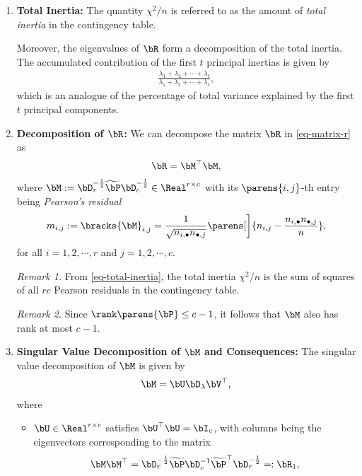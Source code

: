 \documentclass[12pt]{article}
\begin{document}
\begin{enumerate}[label=\textbf{\arabic*.}]
	\item \textbf{Total Inertia:} The quantity $\chi^2/n$ is referred to as the amount of \emph{total inertia} in the contingency table. 
	
	Moreover, the eigenvalues of $\bR$ form a decomposition of the total inertia. The accumulated contribution of the first $t$ principal inertias is given by 
	\begin{align*}
		\frac{\lambda_1 + \lambda_2 + \cdots + \lambda_t}{\lambda_1 + \lambda_2 + \cdots + \lambda_c}, 
	\end{align*}
	which is an analogue of the percentage of total variance explained by the first $t$ principal components. 
	
	\item \textbf{Decomposition of $\bR$:} We can decompose the matrix $\bR$ in \eqref{eq-matrix-r} as 
	\begin{align*}
		\bR = \bM^\top \bM, 
	\end{align*}
	where $\bM := \bD_r^{-\frac{1}{2}} \widetilde{\bP} \bD_c^{-\frac{1}{2}} \in \Real^{r \times c}$ with its $\parens{i, j}$-th entry being \emph{Pearson's residual}
	\begin{align*}
		m_{i,j} := \bracks{\bM}_{i,j} = \frac{1}{\sqrt{n_{i,\bullet} n_{\bullet,j}}} \parens[\bigg]{n_{i,j} - \frac{n_{i,\bullet} n_{\bullet,j}}{n}}, 
	\end{align*}
	for all $i = 1, 2, \cdots, r$ and $j = 1, 2, \cdots, c$. 
	
	\textit{Remark 1.} From \eqref{eq-total-inertia}, the total inertia $\chi^2 / n$ is the sum of squares of all $rc$ Pearson residuals in the contingency table. 
	
	\textit{Remark 2.} Since $\rank \parens{\bP} \le c - 1$, it follows that $\bM$ also has rank at most $c - 1$. 
	
	\item \textbf{Singular Value Decomposition of $\bM$ and Consequences:} The singular value decomposition of $\bM$ is given by 
	\begin{align*}
		\bM = \bU \bD_{\lambda} \bV^\top, 
	\end{align*}
	where 
	\begin{itemize}
		\item $\bU \in \Real^{r \times c}$ satisfies $\bU ^\top \bU = \bI_c$, with columns being the eigenvectors corresponding to the matrix 
		\begin{align*}
			\bM \bM^\top = \bD_r^{-\frac{1}{2}} \widetilde{\bP} \bD^{-1}_c \widetilde{\bP}^\top \bD^{-\frac{1}{2}}_r =: \bR_1, 
		\end{align*}
		

\end{itemize}
\end{enumerate}
\end{document}
